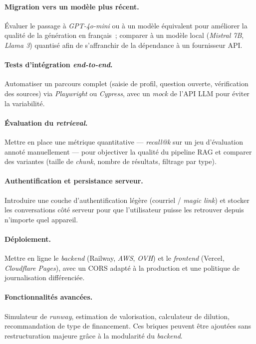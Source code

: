 \paragraph{Migration vers un modèle plus récent.} Évaluer le passage à \textit{GPT-4o-mini} ou à un modèle équivalent pour améliorer la qualité de la génération en français~; comparer à un modèle local (\textit{Mistral 7B}, \textit{Llama 3}) quantisé afin de s'affranchir de la dépendance à un fournisseur \ac{API}.

\paragraph{Tests d'intégration \textit{end-to-end}.} Automatiser un parcours complet (saisie de profil, question ouverte, vérification des sources) via \textit{Playwright} ou \textit{Cypress}, avec un \textit{mock} de l'\ac{API} \ac{LLM} pour éviter la variabilité.

\paragraph{Évaluation du \textit{retrieval}.} Mettre en place une métrique quantitative --- \textit{recall@k} sur un jeu d'évaluation annoté manuellement --- pour objectiver la qualité du pipeline \ac{RAG} et comparer des variantes (taille de \textit{chunk}, nombre de résultats, filtrage par type).

\paragraph{Authentification et persistance serveur.} Introduire une couche d'authentification légère (courriel / \textit{magic link}) et stocker les conversations côté serveur pour que l'utilisateur puisse les retrouver depuis n'importe quel appareil.

\paragraph{Déploiement.} Mettre en ligne le \textit{backend} (Railway, \textit{AWS}, \textit{OVH}) et le \textit{frontend} (Vercel, \textit{Cloudflare Pages}), avec un \ac{CORS} adapté à la production et une politique de journalisation différenciée.

\paragraph{Fonctionnalités avancées.} Simulateur de \textit{runway}, estimation de valorisation, calculateur de dilution, recommandation de type de financement. Ces briques peuvent être ajoutées sans restructuration majeure grâce à la modularité du \textit{backend}.

